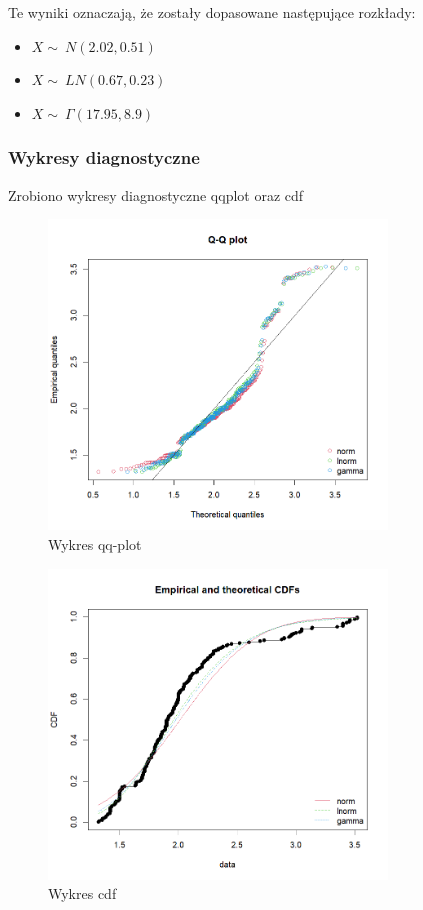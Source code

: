 \documentclass[a4paper,11pt]{article}
\begin{document}
 Te wyniki oznaczają, że zostały dopasowane następujące rozkłady:

\begin{itemize}
  \item $X \sim\ N(2.02, 0.51)$
  \item $X \sim\ LN(0.67, 0.23)$
  \item $X \sim\ \Gamma(17.95, 8.9)$

\end{itemize}

\subsubsection{Wykresy diagnostyczne}
Zrobiono wykresy diagnostyczne qqplot oraz cdf

\begin{figure}[!htb]
  \centering
  \includegraphics[width=9cm]{jjb_qqplot.png}
  \caption{Wykres qq-plot}
  \label{fig:jjb_qqplot}
\end{figure}

\begin{figure}[h]
  \centering
  \includegraphics[width=9cm]{jjb_cdf.png}
  \caption{Wykres cdf}
  \label{fig:jjb_cdf}
\end{figure}
\end{document}
